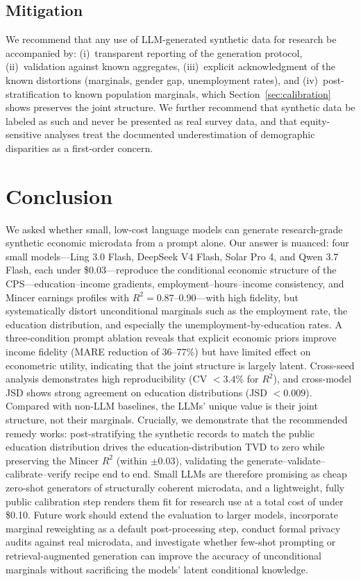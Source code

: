 \documentclass[11pt]{article}
\begin{document}
\subsection{Mitigation}

We recommend that any use of LLM-generated synthetic data for research be accompanied by: (i)~transparent reporting of the generation protocol, (ii)~validation against known aggregates, (iii)~explicit acknowledgment of the known distortions (marginals, gender gap, unemployment rates), and (iv)~post-stratification to known population marginals, which Section~\ref{sec:calibration} shows preserves the joint structure.
We further recommend that synthetic data be labeled as such and never be presented as real survey data, and that equity-sensitive analyses treat the documented underestimation of demographic disparities as a first-order concern.

\section{Conclusion}
\label{sec:conclusion}

We asked whether small, low-cost language models can generate research-grade synthetic economic microdata from a prompt alone.
Our answer is nuanced: four small models---Ling 3.0 Flash, DeepSeek V4 Flash, Solar Pro 4, and Qwen 3.7 Flash, each under \$0.03---reproduce the conditional economic structure of the CPS---education--income gradients, employment--hours--income consistency, and Mincer earnings profiles with $R^2 = 0.87$--0.90---with high fidelity, but systematically distort unconditional marginals such as the employment rate, the education distribution, and especially the unemployment-by-education rates.
A three-condition prompt ablation reveals that explicit economic priors improve income fidelity (MARE reduction of 36--77\%) but have limited effect on econometric utility, indicating that the joint structure is largely latent.
Cross-seed analysis demonstrates high reproducibility (CV $< 3.4\%$ for $R^2$), and cross-model JSD shows strong agreement on education distributions (JSD $< 0.009$).
Compared with non-LLM baselines, the LLMs' unique value is their joint structure, not their marginals.
Crucially, we demonstrate that the recommended remedy works: post-stratifying the synthetic records to match the public education distribution drives the education-distribution TVD to zero while preserving the Mincer $R^2$ (within $\pm 0.03$), validating the generate--validate--calibrate--verify recipe end to end.
Small LLMs are therefore promising as cheap zero-shot generators of structurally coherent microdata, and a lightweight, fully public calibration step renders them fit for research use at a total cost of under \$0.10.
Future work should extend the evaluation to larger models, incorporate marginal reweighting as a default post-processing step, conduct formal privacy audits against real microdata, and investigate whether few-shot prompting or retrieval-augmented generation can improve the accuracy of unconditional marginals without sacrificing the models' latent conditional knowledge.
\end{document}
